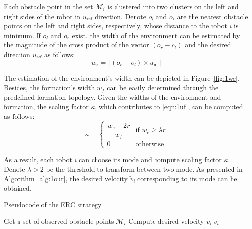 Each obstacle point in the set $\mathcal{M}_{i}$ is clustered into two clusters on the left and right sides of the robot in $u_\text{ref}$ direction. Denote $o_l$ and $o_r$ are the nearest obstacle points on the left and right sides, respectively, whose distance to the robot $i$ is minimum. If $o_l$ and $o_r$ exist, the width of the environment can be estimated by the magnitude of the cross product of the vector $(o_r-o_l)$ and the desired direction $u_\text{ref}$ as follows:
\begin{equation}
    w_e= \left\Vert\left(o_r-o_l\right)\times u_\text{ref}\right\Vert
    \label{eqn:1we}
\end{equation}

The estimation of the environment's width can be depicted in Figure~\ref{fig:1we}. Besides, the formation's width $w_f$ can be easily determined through the predefined formation topology. Given the widths of the environment and formation, the scaling factor $\kappa$, which contributes to \eqref{eqn:1uf}, can be computed as follows:
\begin{equation}
    \kappa = 
    \begin{cases} 
        \dfrac{w_e - 2r}{w_f} & \text{if } w_e \geq \lambda r \\
        0 & \text{otherwise}
    \end{cases}
    \label{eqn:1kappa}
\end{equation}

As a result, each robot $i$ can choose its mode and compute scaling factor $\kappa$. Denote $\lambda>2$ be the threshold to transform between two mode. As presented in Algorithm~\ref{alg:1our}, the desired velocity $\tilde{v}_i$ corresponding to its mode can be obtained.
\begin{algorithm}[h!]
\caption{Pseudocode of the ERC strategy}
\label{alg:1our}
Get a set of observed obstacle points $\mathcal{M}_i$\;
Compute desired velocity $\tilde{v}_i$
\Return $\tilde{v}_i$\;
\end{algorithm}

